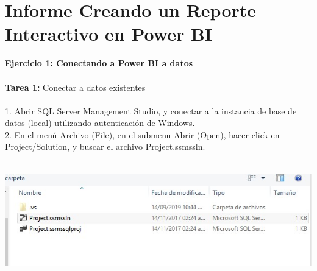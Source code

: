 \documentclass[12pt,letterpaper]{article}
\begin{document}
\section{Informe Creando un Reporte Interactivo en Power BI} 
\begin{flushleft}


\begin{itemize}
\textbf{Ejercicio 1: Conectando a Power BI a datos}\\
\textbf{ }\\
\textbf{Tarea 1: }Conectar a datos existentes \\
\textbf{ }\\

1. Abrir SQL Server Management Studio, y conectar a la instancia de base de datos (local) utilizando
autenticación de Windows.\\
2. En el menú Archivo (File), en el submenu Abrir (Open), hacer click en Project/Solution, y buscar el archivo
Project.ssmssln.\\
\textbf{ }\\
\begin{center}
	\includegraphics[width=15cm]{./Imagenes/image1} 
	\end{center}
\textbf{ }\\



\end{itemize}
\end{flushleft}
\end{document}
